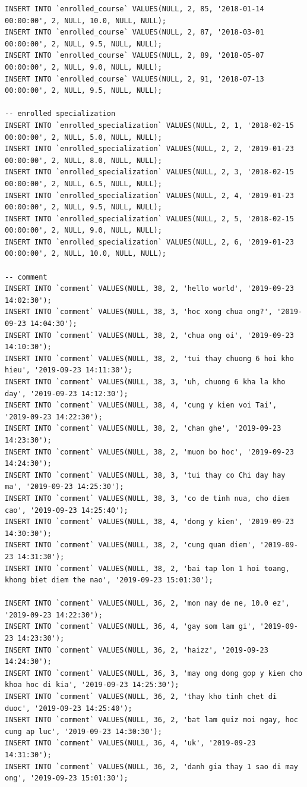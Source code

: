 \documentclass[12pt,a4paper,titlepage]{article}
\begin{document}
\begin{lstlisting}
INSERT INTO `enrolled_course` VALUES(NULL, 2, 85, '2018-01-14 00:00:00', 2, NULL, 10.0, NULL, NULL);
INSERT INTO `enrolled_course` VALUES(NULL, 2, 87, '2018-03-01 00:00:00', 2, NULL, 9.5, NULL, NULL);
INSERT INTO `enrolled_course` VALUES(NULL, 2, 89, '2018-05-07 00:00:00', 2, NULL, 9.0, NULL, NULL);
INSERT INTO `enrolled_course` VALUES(NULL, 2, 91, '2018-07-13 00:00:00', 2, NULL, 9.5, NULL, NULL);

-- enrolled specialization
INSERT INTO `enrolled_specialization` VALUES(NULL, 2, 1, '2018-02-15 00:00:00', 2, NULL, 5.0, NULL, NULL);
INSERT INTO `enrolled_specialization` VALUES(NULL, 2, 2, '2019-01-23 00:00:00', 2, NULL, 8.0, NULL, NULL);
INSERT INTO `enrolled_specialization` VALUES(NULL, 2, 3, '2018-02-15 00:00:00', 2, NULL, 6.5, NULL, NULL);
INSERT INTO `enrolled_specialization` VALUES(NULL, 2, 4, '2019-01-23 00:00:00', 2, NULL, 9.5, NULL, NULL);
INSERT INTO `enrolled_specialization` VALUES(NULL, 2, 5, '2018-02-15 00:00:00', 2, NULL, 9.0, NULL, NULL);
INSERT INTO `enrolled_specialization` VALUES(NULL, 2, 6, '2019-01-23 00:00:00', 2, NULL, 10.0, NULL, NULL);

-- comment
INSERT INTO `comment` VALUES(NULL, 38, 2, 'hello world', '2019-09-23 14:02:30');
INSERT INTO `comment` VALUES(NULL, 38, 3, 'hoc xong chua ong?', '2019-09-23 14:04:30');
INSERT INTO `comment` VALUES(NULL, 38, 2, 'chua ong oi', '2019-09-23 14:10:30');
INSERT INTO `comment` VALUES(NULL, 38, 2, 'tui thay chuong 6 hoi kho hieu', '2019-09-23 14:11:30');
INSERT INTO `comment` VALUES(NULL, 38, 3, 'uh, chuong 6 kha la kho day', '2019-09-23 14:12:30');
INSERT INTO `comment` VALUES(NULL, 38, 4, 'cung y kien voi Tai', '2019-09-23 14:22:30');
INSERT INTO `comment` VALUES(NULL, 38, 2, 'chan ghe', '2019-09-23 14:23:30');
INSERT INTO `comment` VALUES(NULL, 38, 2, 'muon bo hoc', '2019-09-23 14:24:30');
INSERT INTO `comment` VALUES(NULL, 38, 3, 'tui thay co Chi day hay ma', '2019-09-23 14:25:30');
INSERT INTO `comment` VALUES(NULL, 38, 3, 'co de tinh nua, cho diem cao', '2019-09-23 14:25:40');
INSERT INTO `comment` VALUES(NULL, 38, 4, 'dong y kien', '2019-09-23 14:30:30');
INSERT INTO `comment` VALUES(NULL, 38, 2, 'cung quan diem', '2019-09-23 14:31:30');
INSERT INTO `comment` VALUES(NULL, 38, 2, 'bai tap lon 1 hoi toang, khong biet diem the nao', '2019-09-23 15:01:30');

INSERT INTO `comment` VALUES(NULL, 36, 2, 'mon nay de ne, 10.0 ez', '2019-09-23 14:22:30');
INSERT INTO `comment` VALUES(NULL, 36, 4, 'gay som lam gi', '2019-09-23 14:23:30');
INSERT INTO `comment` VALUES(NULL, 36, 2, 'haizz', '2019-09-23 14:24:30');
INSERT INTO `comment` VALUES(NULL, 36, 3, 'may ong dong gop y kien cho khoa hoc di kia', '2019-09-23 14:25:30');
INSERT INTO `comment` VALUES(NULL, 36, 2, 'thay kho tinh chet di duoc', '2019-09-23 14:25:40');
INSERT INTO `comment` VALUES(NULL, 36, 2, 'bat lam quiz moi ngay, hoc cung ap luc', '2019-09-23 14:30:30');
INSERT INTO `comment` VALUES(NULL, 36, 4, 'uk', '2019-09-23 14:31:30');
INSERT INTO `comment` VALUES(NULL, 36, 2, 'danh gia thay 1 sao di may ong', '2019-09-23 15:01:30');
\end{lstlisting}
\end{document}
